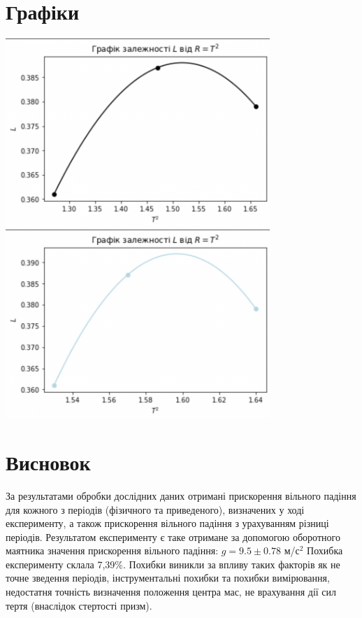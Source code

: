 \documentclass[a4paper,12pt]{article}
\begin{document}
\section{Графіки}
\begin{center}
	\includegraphics[width=10cm]{graph7}
	\includegraphics[width=10cm]{graph8}
\end{center}
\newpage\section{Висновок}
За результатами обробки дослідних даних отримані прискорення вільного падіння для кожного з періодів (фізичного та приведеного), визначених у ході експерименту, а також прискорення вільного падіння з урахуванням різниці  періодів.
Результатом експерименту є таке отримане за допомогою оборотного маятника значення прискорення вільного падіння: $g=9.5\pm0.78$ м/с$^2$ 
Похибка експерименту склала 7,39$\%$. Похибки виникли за впливу таких факторів як не точне зведення періодів, інструментальні похибки та похибки вимірювання, недостатня точність визначення положення центра мас, не врахування дії сил тертя (внаслідок стертості призм).
\end{document}
